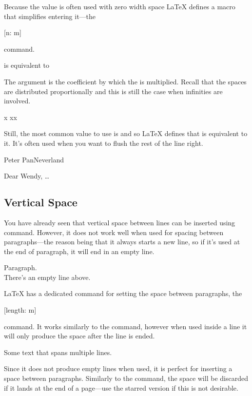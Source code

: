 Because the  value is often used with zero width space \LaTeX{}
defines a macro that simplifies entering it---the
\begin{lscommand}
  [n: m]
\end{lscommand}
command.
\begin{example}
is equivalent to
\hspace*{0pt plus 1fill}
\linebreak
\end{example}
The  argument is the coefficient by which the  is
multiplied. Recall that the spaces are distributed proportionally and this is
still the case when infinities are involved.
\begin{example}
x%
xx
\end{example}

Still, the most common value to use is \ltx{\hspace{0pt plus 1fill}} and so
\LaTeX{} defines  that is equivalent to it. It's often used when you
want to flush the rest of the line right.
\begin{example}
Peter Pan\hfill Neverland

Dear Wendy, \ldots
\end{example}

\subsection{Vertical Space}

You have already seen that vertical space between lines can be inserted using
\csi{\bs} command. However, it does not work well when used for spacing between
paragraphs---the reason being that it always starts a new line, so if it's used
at the end of paragraph, it will end in an empty line.
\begin{example}
Paragraph.\\

There's an empty line above.
\end{example}
\LaTeX{} has a dedicated command for setting the space between paragraphs, the
\begin{lscommand}
  [length: m]
\end{lscommand}
command. It works similarly to the  command, however when used
inside a line it will only produce the space after the line is ended.
\begin{example}
Some\vspace{1em} text that
spans multiple lines.
\end{example}
Since it does not produce empty lines when used, it is perfect for inserting a
space between paragraphs. Similarly to the  command, the space will
be discarded if it lands at the end of a page---use the starred version if this
is not desirable.

